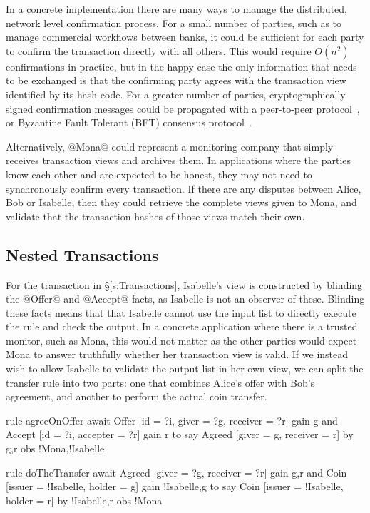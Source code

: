 In a concrete implementation there are many ways to manage the distributed, network level confirmation process. For a small number of parties, such as to manage commercial workflows between banks, it could be sufficient for each party to confirm the transaction directly with all others. This would require $O(n^2)$ confirmations in practice, but in the happy case the only information that needs to be exchanged is that the confirming party agrees with the transaction view identified by its hash code. For a greater number of parties, cryptographically signed confirmation messages could be propagated with a peer-to-peer protocol~\cite{El-Ansary2003:Broadcast}, or Byzantine Fault Tolerant (BFT) consensus protocol~\cite{Lamport1982:Byzantine, Ongaro2014:Consensus, Gilad2017:Algorand}.

Alternatively, @Mona@ could represent a monitoring company that simply receives transaction views and archives them. In applications where the parties know each other and are expected to be honest, they may not need to synchronously confirm every transaction. If there are any disputes between Alice, Bob or Isabelle, then they could retrieve the complete views given to Mona, and validate that the transaction hashes of those views match their own.

\eject{}
\subsection{Nested Transactions}
\label{s:NestedTransactions}
For the transaction in \S\ref{s:Transactions}, Isabelle's view is constructed by blinding the @Offer@ and @Accept@ facts, as Isabelle is not an observer of these. Blinding these facts means that that Isabelle cannot use the input list to directly execute the rule and check the output. In a concrete application where there is a trusted monitor, such as Mona, this would not matter as the other parties would expect Mona to answer truthfully whether her transaction view is valid. If we instead wish to allow Isabelle to validate the output list in her own view, we can split the transfer rule into two parts: one that combines Alice's offer with Bob's agreement, and another to perform the actual coin transfer.

\begin{small}
\begin{code}
  rule  agreeOnOffer
  await Offer  [id = ?i, giver = ?g, receiver = ?r] gain {g}
    and Accept [id = ?i, accepter = ?r]             gain {r}
  to
    say Agreed [giver = g, receiver = r]
     by {g,r}  obs {!Mona,!Isabelle}

  rule  doTheTransfer
  await Agreed [giver = ?g, receiver = ?r]        gain {g,r}
   and  Coin   [issuer = !Isabelle, holder = g]
        gain {!Isabelle,g}
  to
    say Coin   [issuer = !Isabelle, holder = r]
     by {!Isabelle,r} obs {!Mona}
\end{code}
\end{small}

